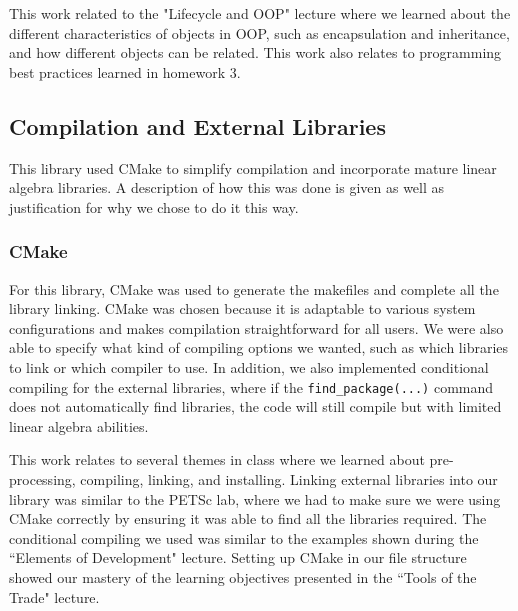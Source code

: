 This work related to the "Lifecycle and OOP" lecture where we learned about the different characteristics of objects in OOP, such as encapsulation and inheritance, and how different objects can be related. This work also relates to programming best practices learned in homework 3.
\subsection {Compilation and External Libraries}
This library used CMake to simplify compilation and incorporate mature linear algebra libraries. A description of how this was done is given as well as justification for why we chose to do it this way.
\subsubsection{CMake}
For this library, CMake was used to generate the makefiles and complete all the library linking. CMake was chosen because it is adaptable to various system configurations and makes compilation straightforward for all users. We were also able to specify what kind of compiling options we wanted, such as which libraries to link or which compiler to use. In addition, we also implemented conditional compiling for the external libraries, where if the \texttt{find\_package(...)} command does not automatically find libraries, the code will still compile but with limited linear algebra abilities. 


This work relates to several themes in class where we learned about pre-processing, compiling, linking, and installing. Linking external libraries into our library was similar to the PETSc lab, where we had to make sure we were using CMake correctly by ensuring it was able to find all the libraries required. The conditional compiling we used was similar to the examples shown during the ``Elements of Development" lecture. Setting up CMake in our file structure showed our mastery of the learning objectives presented in the ``Tools of the Trade" lecture.
